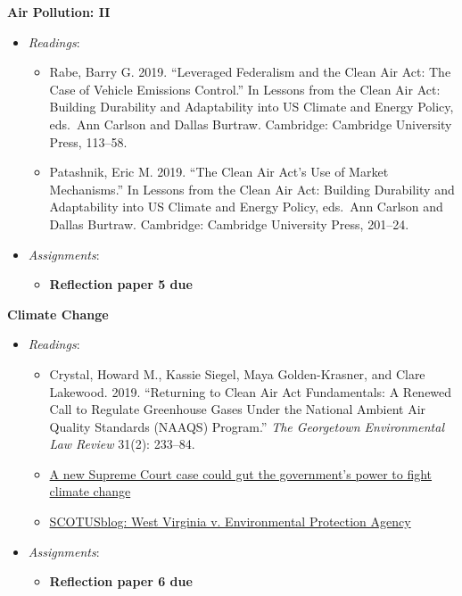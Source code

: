 \week \textbf{Air Pollution: II}

\begin{itemize}

\item
  \emph{Readings}:

  \begin{itemize}
  
  \item
    Rabe, Barry G. 2019. ``Leveraged Federalism and the Clean Air Act:
    The Case of Vehicle Emissions Control.'' In Lessons from the Clean
    Air Act: Building Durability and Adaptability into US Climate and
    Energy Policy, eds.~Ann Carlson and Dallas Burtraw. Cambridge:
    Cambridge University Press, 113--58.
  \item
    Patashnik, Eric M. 2019. ``The Clean Air Act's Use of Market
    Mechanisms.'' In Lessons from the Clean Air Act: Building Durability
    and Adaptability into US Climate and Energy Policy, eds.~Ann Carlson
    and Dallas Burtraw. Cambridge: Cambridge University Press, 201--24.
  \end{itemize}
\item
  \emph{Assignments}:

  \begin{itemize}
  
  \item
    \textbf{Reflection paper 5 due}
  \end{itemize}
\end{itemize}

\week \textbf{Climate Change}

\begin{itemize}

\item
  \emph{Readings}:

  \begin{itemize}
  
  \item
    Crystal, Howard M., Kassie Siegel, Maya Golden-Krasner, and Clare
    Lakewood. 2019. ``Returning to Clean Air Act Fundamentals: A Renewed
    Call to Regulate Greenhouse Gases Under the National Ambient Air
    Quality Standards (NAAQS) Program.'' \emph{The Georgetown
    Environmental Law Review} 31(2): 233--84.
  \item
    \href{https://www.vox.com/platform/amp/2021/11/3/22758188/climate-change-epa-clean-power-plan-supreme-court}{A
    new Supreme Court case could gut the government's power to fight
    climate change}
  \item
    \href{https://www.scotusblog.com/case-files/cases/west-virginia-v-environmental-protection-agency/}{SCOTUSblog:
    West Virginia v. Environmental Protection Agency}
  \end{itemize}
\item
  \emph{Assignments}:

  \begin{itemize}
  
  \item
    \textbf{Reflection paper 6 due}
  \end{itemize}
\end{itemize}

